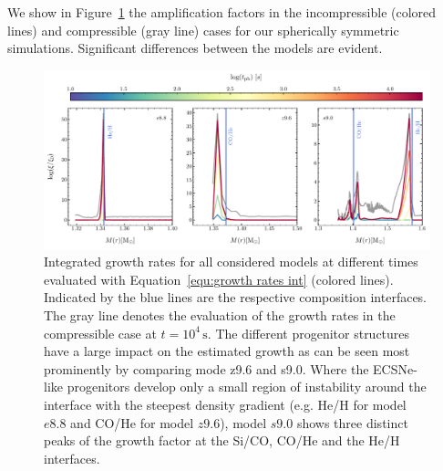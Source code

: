 \documentclass[fleqn,usenatbib]{mnras}
\begin{document}
We show in Figure~\ref{fig:growth rates} the amplification factors in the incompressible (colored lines) and compressible (gray line) cases for our spherically symmetric simulations. Significant differences between the models are evident.
\begin{figure}
 \centering
 \includegraphics[width=\textwidth]{pic/growth_rates_1d_paper.pdf}
 \caption{Integrated growth rates for all considered models at different times evaluated with Equation~\ref{equ:growth rates int} (colored lines). Indicated by the blue lines are the respective composition interfaces. The gray line denotes the evaluation of the growth rates in the compressible case at $t=10^{4}\,\text{s}$. The different progenitor structures have a large impact on the estimated growth as can be seen most prominently by comparing mode z9.6 and s9.0. Where the ECSNe-like progenitors develop only a small region of instability around the interface with the steepest density gradient (e.g. He/H for model $e8.8$ and CO/He for model $z9.6$), model $s9.0$ shows three distinct peaks of the growth factor at the Si/CO, CO/He and the He/H interfaces. }
 \label{fig:growth rates}
\end{figure}
\end{document}

